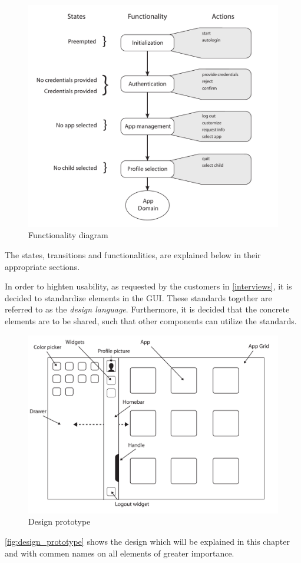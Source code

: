 \begin{figure}[h!]
	\centering
	\includegraphics[width=1\textwidth]{gfx/design_diagram.pdf}
	\caption{Functionality diagram}
	\label{fig:design_diagram}
\end{figure}

The states, transitions and functionalities, are explained below in their appropriate sections.

In order to highten usability, as requested by the customers in \autoref{interviews}, it is decided to standardize elements in the GUI. These standards together are referred to as the \emph{design language}.
Furthermore, it is decided that the concrete elements are to be shared, such that other \giraf[] components can utilize the standards.

\begin{figure}[h!]
	\centering
	\includegraphics[width=1\textwidth]{gfx/design_prototype.pdf}
	\caption{Design prototype}
	\label{fig:design_prototype}
\end{figure}

\autoref{fig:design_prototype} shows the design which will be explained in this chapter and with commen names on all elements of greater importance.